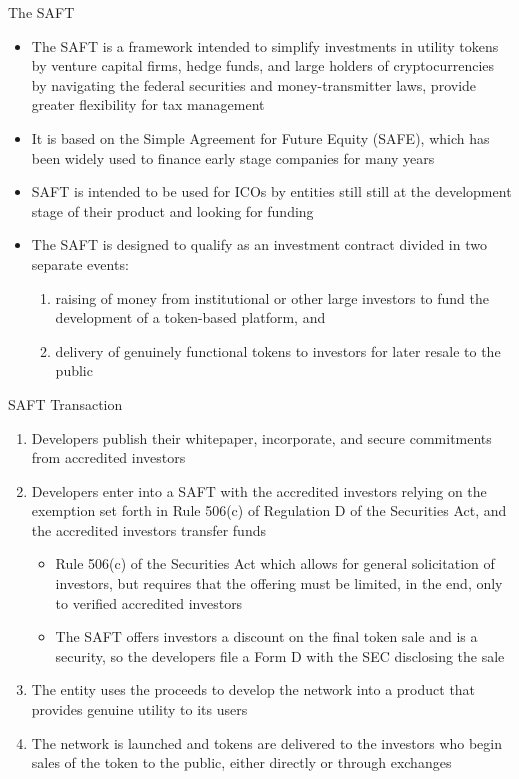 \documentclass[9pt]{beamer}
\begin{document}

\begin{frame}{The SAFT}
	\begin{itemize}
		\item The SAFT is a framework intended to simplify investments in utility tokens by venture capital firms, hedge funds, and large holders of cryptocurrencies by navigating the federal securities and money-transmitter laws, provide greater flexibility for tax management
		\item It is based on the Simple Agreement for Future Equity (SAFE), which has been widely used to finance early stage companies for many years
		\item SAFT is intended to be used for ICOs by entities still still at the development stage of their product and looking for funding
		\item The SAFT is designed to qualify as an investment contract divided in two separate events:
		\begin{enumerate}
			\item raising of money from institutional or other large investors to fund the development of a token-based platform, and
			\item delivery of genuinely functional tokens to investors for later resale to the public
		\end{enumerate}
	\end{itemize}
\end{frame}


\begin{frame}{SAFT Transaction}
	\begin{enumerate}
		\item Developers publish their whitepaper, incorporate, and secure commitments from accredited investors
		\item Developers enter into a SAFT with the accredited investors relying on the exemption set forth in Rule 506(c) of Regulation D of the Securities Act, and the accredited investors transfer funds
		\begin{itemize}
			\item Rule 506(c) of the Securities Act which allows for general solicitation of investors, but requires that the offering must be limited, in the end, only to verified accredited investors
			\item The SAFT offers investors a discount on the final token sale and is a security, so the developers file a Form D with the SEC disclosing the sale
		\end{itemize}
		\item The entity uses the proceeds to develop the network into a product that provides genuine utility to its users
		\item The network is launched and tokens are delivered to the investors who begin sales of the token to the public, either directly or through exchanges
	\end{enumerate}
\end{frame}
\end{document}
